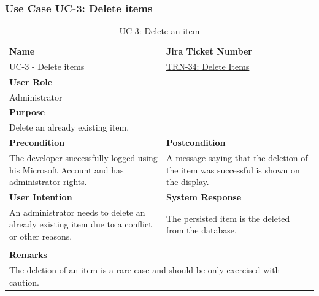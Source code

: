 \subsubsection{Use Case UC-3: Delete items}\label{subsubsec:use-case-uc-3:-delete-items}

\begin{table}[H]
    \centering
    \begin{tabular}{|p{}|p{}|}

        \hline
        \rowcolor{gray!50}\textbf{Name} & \rowcolor{gray!50}\textbf{Jira Ticket Number} \\
        UC-3 - Delete items
        &
        \href{https://fh-burgenland.atlassian.net/browse/TRN-34}{TRN-34: Delete Items} \\ \hline

        \multicolumn{2}{|l|}{\rowcolor{gray!50}\textbf{User Role}} \\
        \multicolumn{2}{|l|}{Administrator} \\ \hline

        \multicolumn{2}{|l|}{\rowcolor{gray!50}\textbf{Purpose}} \\
        \multicolumn{2}{|l|}{Delete an already existing item.} \\ \hline

        \rowcolor{gray!50}\textbf{Precondition} & \rowcolor{gray!50}\textbf{Postcondition} \\
        The developer successfully logged using his Microsoft Account and has administrator rights.
        &
        A message saying that the deletion of the item was successful is shown on the display. \\ \hline

        \rowcolor{gray!50}\textbf{User Intention} & \rowcolor{gray!50}\textbf{System Response} \\
        An administrator needs to delete an already existing item due to a conflict or other reasons.
        &
        The persisted item is the deleted from the database. \\ \hline

        & \\ \hline

        \multicolumn{2}{|l|}{\rowcolor{gray!50}\textbf{Remarks}} \\
        \multicolumn{2}{|p{1\textwidth}|}{The deletion of an item is a rare case and should be only exercised with caution.} \\ \hline
    \end{tabular}
    \caption{UC-3: Delete an item}
    \label{tab:uc-delete-an-item}
\end{table}

